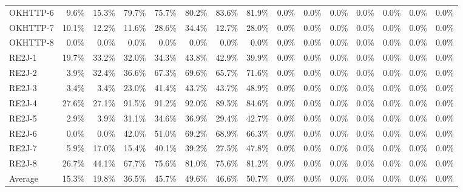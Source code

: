 \begin{tabular}{ l rrrrrrr rrrrrrr}
OKHTTP-6 &  9.6\% &  15.3\% &  79.7\% &  75.7\% &  80.2\% &  83.6\% &  81.9\% &  0.0\% &  0.0\% &  0.0\% &  0.0\% &  0.0\% &  0.0\% &  0.0\%\\ 
OKHTTP-7 &  10.1\% &  12.2\% &  11.6\% &  28.6\% &  34.4\% &  12.7\% &  28.0\% &  0.0\% &  0.0\% &  0.0\% &  0.0\% &  0.0\% &  0.0\% &  0.0\%\\ 
OKHTTP-8 &  0.0\% &  0.0\% &  0.0\% &  0.0\% &  0.0\% &  0.0\% &  0.0\% &  0.0\% &  0.0\% &  0.0\% &  0.0\% &  0.0\% &  0.0\% &  0.0\%\\ 
RE2J-1 &  19.7\% &  33.2\% &  32.0\% &  34.3\% &  43.8\% &  42.9\% &  39.9\% &  0.0\% &  0.0\% &  0.0\% &  0.0\% &  0.0\% &  0.0\% &  0.0\%\\ 
RE2J-2 &  3.9\% &  32.4\% &  36.6\% &  67.3\% &  69.6\% &  65.7\% &  71.6\% &  0.0\% &  0.0\% &  0.0\% &  0.0\% &  0.0\% &  0.0\% &  0.0\%\\ 
RE2J-3 &  3.4\% &  3.4\% &  23.0\% &  41.4\% &  43.7\% &  43.7\% &  48.9\% &  0.0\% &  0.0\% &  0.0\% &  0.0\% &  0.0\% &  0.0\% &  0.0\%\\ 
RE2J-4 &  27.6\% &  27.1\% &  91.5\% &  91.2\% &  92.0\% &  89.5\% &  84.6\% &  0.0\% &  0.0\% &  0.0\% &  0.0\% &  0.0\% &  0.0\% &  0.0\%\\ 
RE2J-5 &  2.9\% &  3.9\% &  31.1\% &  34.6\% &  36.9\% &  29.4\% &  42.7\% &  0.0\% &  0.0\% &  0.0\% &  0.0\% &  0.0\% &  0.0\% &  0.0\%\\ 
RE2J-6 &  0.0\% &  0.0\% &  42.0\% &  51.0\% &  69.2\% &  68.9\% &  66.3\% &  0.0\% &  0.0\% &  0.0\% &  0.0\% &  0.0\% &  0.0\% &  0.0\%\\ 
RE2J-7 &  5.9\% &  17.0\% &  15.4\% &  40.1\% &  39.2\% &  27.5\% &  47.8\% &  0.0\% &  0.0\% &  0.0\% &  0.0\% &  0.0\% &  0.0\% &  0.0\%\\ 
RE2J-8 &  26.7\% &  44.1\% &  67.7\% &  75.6\% &  81.0\% &  75.6\% &  81.2\% &  0.0\% &  0.0\% &  0.0\% &  0.0\% &  0.0\% &  0.0\% &  0.0\%\\ 
\midrule 
Average  &  15.3\% &  19.8\% &  36.5\% &  45.7\% &  49.6\% &  46.6\% &  50.7\% &  0.0\% &  0.0\% &  0.0\% &  0.0\% &  0.0\% &  0.0\% &  0.0\%\\ 
\bottomrule 
\end{tabular} 
